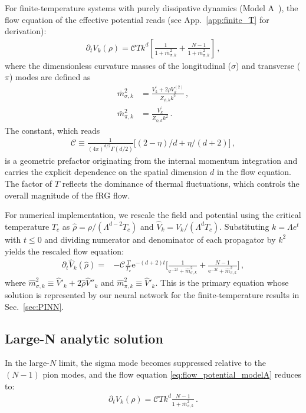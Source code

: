 \documentclass[reprint,twocolumn,superscriptaddress,preprintnumbers,amsmath,amssymb,aps,prd,floatfix]{revtex4-2}
\def\Sec#1{Sec.~\ref{#1}}
\def\App#1{App.~\ref{#1}}
\begin{document}
For finite-temperature systems with purely dissipative dynamics (Model A~\cite{Hohenberg:1977ym}), the flow equation of the effective potential reads (see \App{app:finite_T} for derivation):
\begin{align}
	\partial_t V_k(\rho)=\mathscr{C}T k^d\left[\frac{1}{1+\bar{m}_{\sigma, k}^2}+\frac{N-1}{1+\bar{m}_{\pi, k}^2}\right]\,,
	\label{eq:flow_potential_modelA}
\end{align}
where the dimensionless curvature masses of the longitudinal ($\sigma$) and transverse ($\pi$) modes are defined as
\begin{align}
	\bar{m}_{\sigma, k}^2 &= \frac{V_k^{\prime}+2 \rho V_k^{(2)}}{Z_{\phi, k} k^2}\,,\nonumber\\[2ex]
	\bar{m}_{\pi, k}^2 &= \frac{V_k^{\prime}}{Z_{\phi, k} k^2}\,.\label{}
\end{align}
The constant, which reads
\begin{align}
	\mathscr{C} \equiv \frac{1}{(4 \pi)^{d / 2} \Gamma(d / 2)}\big[(2-\eta)/d+\eta/(d+2)\big]\,,\label{}
\end{align}
is a geometric prefactor originating from the internal momentum integration and carries the explicit dependence on the spatial dimension $d$ in the flow equation. The factor of $T$ reflects the dominance of thermal fluctuations, which controls the overall magnitude of the fRG flow.

For numerical implementation, we rescale the field and potential using the critical temperature $T_c$ as $\hat{\rho}=\rho/(\Lambda^{d-2} T_c)$ and $\hat{V}_k=V_k/(\Lambda^d T_c)$. Substituting $k=\Lambda e^t$ with $t\leq 0$ and dividing numerator and denominator of each propagator by $k^2$ yields the rescaled flow equation:
\begin{align}
	\partial_t \hat{V}_k(\hat{\rho})= &-\mathscr{C}\frac{T}{T_c}\mathrm{e}^{-(d+2)t}\Bigg[\frac{1}{\mathrm{e}^{-2t}+\hat{m}_{\sigma, k}^2}+\frac{N-1}{\mathrm{e}^{-2t}+\hat{m}_{\pi, k}^2}\Bigg]\,,
	\label{eq:flow_potential_rescale}
\end{align}
where $\hat{m}_{\sigma, k}^2 \equiv \hat{V}'_k+2 \hat{\rho} \hat{V}''_k$ and $\hat{m}_{\pi, k}^2 \equiv \hat{V}'_k$. This is the primary equation whose solution is represented by our neural network for the finite-temperature results in \Sec{sec:PINN}.

\subsection{Large-N analytic solution}
\label{sec:largeN}
In the large-$N$ limit, the sigma mode becomes suppressed relative to the $(N-1)$ pion modes, and the flow equation \eqref{eq:flow_potential_modelA} reduces to:
\begin{align}
	\partial_t V_k(\rho)=\mathscr{C}T k^d\frac{N-1}{1+\bar{m}_{\pi, k}^2}\,.
	\label{eq:flow_potential_modelA_largeN}
\end{align}
\end{document}
